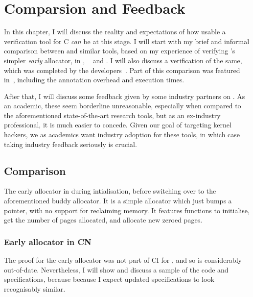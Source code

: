 \chapter{ Comparsion and Feedback}

\margintoc{}

In this chapter, I will discuss the reality and expectations of how usable a
verification tool for C \emph{can} be at this stage. I will start with my brief
and informal comparison between  and similar tools, based on my
experience of verifying 's simpler \emph{early} allocator, in ,
~ and
.
I will also discuss a  verification of the same, which was
completed by the developers~. Part of this
comparison was featured in~, including the annotation
overhead and execution times.

After that, I will discuss some feedback given by some industry partners on
. As an academic, these seem borderline unreasonable, especially when
compared to the aforementioned state-of-the-art research tools, but as an
ex-industry professional, it is much easier to concede. Given our goal of
targeting kernel hackers, we as academics want industry adoption for these
tools, in which case taking industry feedback seriously is crucial.

\section{Comparison}

The early allocator in  during intialisation, before switching over to
the aforementioned buddy allocator. It is a simple allocator which just bumps a
pointer, with no support for reclaiming memory. It features functions to
initialise, get the number of pages allocated, and allocate new zeroed pages.

\subsection{Early allocator in CN}

The proof for the early allocator was not part of CI for , and so is
considerably out-of-date. Nevertheless, I will show and discuss a sample
of the code and specifications, because because I expect updated specifications
to look recognisably similar.


